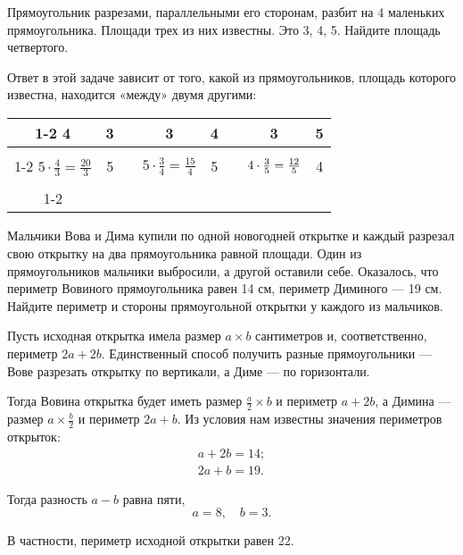 \begin{itemize}

\itA Прямоугольник разрезами, параллельными его сторонам, разбит на 4 маленьких прямоугольника. Площади трех из них известны. Это 3, 4, 5. Найдите площадь четвертого.

\itr Ответ в этой задаче зависит от того, какой из прямоугольников, площадь которого известна, находится «между» двумя другими:

\def\lins{\cline{1-2} \cline{4-5} \cline{7-8}}
\begin{center} \begin{tabular}{|c|c|c|c|c|c|c|c|}
	\lins
	4 & 3 & \hspace{0.8cm} & 3 & 4 & \hspace{0.8cm} & 3 & 5 \\ \lins
	$5 \cdot \tfrac{4}{3} = \tfrac{20}{3}$ & 5 & &
	$5 \cdot \tfrac{3}{4} = \tfrac{15}{4}$ & 5 & &
	$4 \cdot \tfrac{3}{5} = \vphantom{\int\limits_0^0}
		\tfrac{12}{5}$ & 4 \\ \lins
\end{tabular} \end{center}

\itB Мальчики Вова и Дима купили по одной новогодней открытке и каждый разрезал свою открытку на два прямоугольника равной площади. Один из прямоугольников мальчики выбросили, а другой оставили себе. Оказалось, что периметр Вовиного прямоугольника равен 14 см, периметр Диминого — 19 см. Найдите периметр и стороны прямоугольной открытки у каждого из мальчиков.

\itr Пусть исходная открытка имела размер $a \times b$ сантиметров и, соответственно, периметр $2a+2b$. Единственный способ получить разные прямоугольники — Вове разрезать открытку по вертикали, а Диме — по горизонтали.

Тогда Вовина открытка будет иметь размер $\tfrac{a}{2} \times b$ и периметр $a+2b$, а Димина — размер $a \times \tfrac{b}{2}$ и периметр $2a+b$. Из условия нам известны значения периметров открыток:
\begin{align*}
	a+2b = 14; \\
	2a+b = 19.
\end{align*}

Тогда разность $a-b$ равна пяти,
	$$a=8,\quad b=3.$$
	
В частности, периметр исходной открытки равен \SI{22}{}.

\end{itemize}


